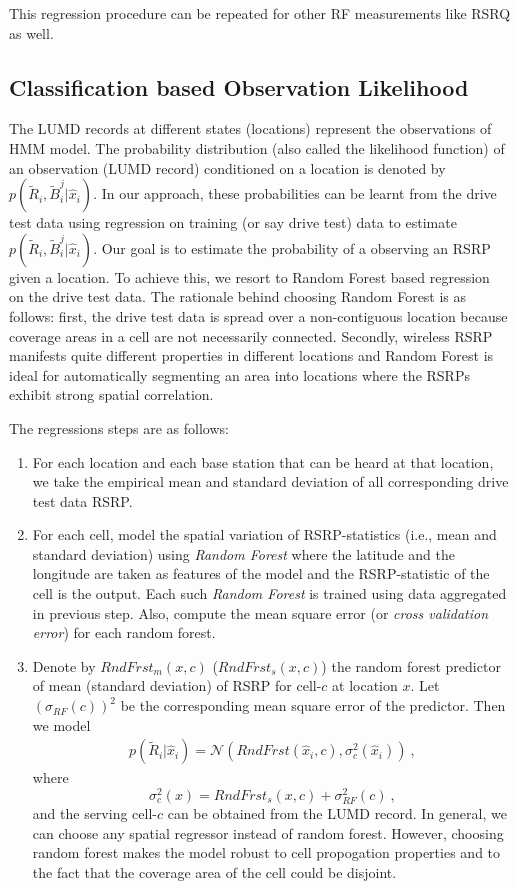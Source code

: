 \documentclass[conference, 10pt]{IEEEtran}
\begin{document}
This regression procedure can be repeated for other RF measurements like RSRQ as
well.

\subsection{Classification based Observation Likelihood}
\label{sec:prob-reg}
The LUMD records at different states
(locations) represent the observations of HMM model. The probability
distribution (also called the likelihood function) of an observation (LUMD record) 
conditioned on a location is denoted by
$p(\tilde{R}_i, \tilde{B}^j_i|\hat{x}_{i})$. In our approach, these probabilities
can be learnt from the drive test data using regression on training (or say drive test) data to
estimate $p(\tilde{R}_i, \tilde{B}^j_i|\hat{x}_{i})$.
Our goal is to estimate the probability of a observing an RSRP given a location.  To
achieve this, we resort to Random Forest based regression~\cite{BreimanRandFor} on
the drive test data.  The rationale behind choosing Random Forest is as follows:
first, the drive test data is spread over a non-contiguous location because coverage
areas in a cell are not necessarily connected.  Secondly, wireless RSRP
manifests quite different properties in different locations and Random Forest is ideal
for automatically segmenting an area into locations where the RSRPs
exhibit strong spatial correlation.

The regressions steps are as follows:

\begin{enumerate}

\item For each location and each base station that can be heard at that location, we
take the empirical mean and standard deviation of all corresponding drive test data
RSRP. 

\item For each cell, model the spatial variation of RSRP-statistics (i.e., mean and
standard deviation) using {\em Random Forest} where the latitude and the longitude are 
taken as features of the model and the RSRP-statistic  of the cell is the output. Each such {\em
Random Forest} is trained using data aggregated in previous step. Also,
compute the mean square error (or {\em cross validation error})
for each random forest.

\item Denote by $RndFrst_m(x,c)$ ($RndFrst_s(x,c)$) the random forest predictor of
mean (standard deviation) of RSRP for cell-$c$
at location $x$. Let $(\sigma_{RF}(c))^2$ be the corresponding
mean square error of the predictor. Then we model
\begin{align}
p(\tilde{R}_i|\hat{x}_{i}) =
\mathcal{N}(RndFrst(\hat{x}_{i},c), \sigma_c^2(\hat{x}_i))\ ,
\end{align}
where $$\sigma_c^2(x) = RndFrst_s(x,c) + \sigma_{RF}^2(c)\ ,$$ 
and the serving cell-$c$ can be obtained from the LUMD record. In general, we
can choose any spatial regressor instead of random forest. However, choosing
random forest makes the model robust to cell propogation properties and to the
fact that the coverage area of the cell could be disjoint.

\end{enumerate}
\end{document}
